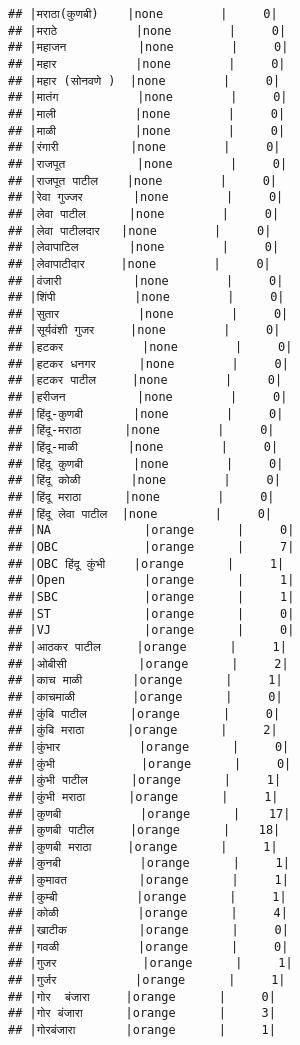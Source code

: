 \documentclass[
]{article}
\begin{document}
\begin{verbatim}
## |मराठा(कुणबी)    |none        |     0|
## |मराठे           |none        |     0|
## |महाजन          |none        |     0|
## |महार           |none        |     0|
## |महार (सोनवणे )  |none        |     0|
## |मातंग           |none        |     0|
## |माली           |none        |     0|
## |माळी           |none        |     0|
## |रंगारी          |none        |     0|
## |राजपूत          |none        |     0|
## |राजपूत पाटील    |none        |     0|
## |रेवा गुज्जर       |none        |     0|
## |लेवा पाटील      |none        |     0|
## |लेवा पाटीलदार   |none        |     0|
## |लेवापाटिल       |none        |     0|
## |लेवापाटीदार     |none        |     0|
## |वंजारी          |none        |     0|
## |शिंपी           |none        |     0|
## |सुतार           |none        |     0|
## |सूर्यवंशी गुजर     |none        |     0|
## |हटकर           |none        |     0|
## |हटकर धनगर      |none        |     0|
## |हटकर पाटील     |none        |     0|
## |हरीजन          |none        |     0|
## |हिंदू-कुणबी       |none        |     0|
## |हिंदू-मराठा      |none        |     0|
## |हिंदू-माळी       |none        |     0|
## |हिंदू कुणबी       |none        |     0|
## |हिंदू कोळी       |none        |     0|
## |हिंदू मराठा      |none        |     0|
## |हिंदू लेवा पाटील  |none        |     0|
## |NA             |orange      |     0|
## |OBC            |orange      |     7|
## |OBC हिंदू कुंभी    |orange      |     1|
## |Open           |orange      |     1|
## |SBC            |orange      |     1|
## |ST             |orange      |     0|
## |VJ             |orange      |     0|
## |आठकर पाटील     |orange      |     1|
## |ओबीसी          |orange      |     2|
## |काच माळी       |orange      |     1|
## |काचमाळी        |orange      |     0|
## |कुंबि पाटील      |orange      |     0|
## |कुंबि मराठा      |orange      |     2|
## |कुंभार           |orange      |     0|
## |कुंभी            |orange      |     0|
## |कुंभी पाटील      |orange      |     1|
## |कुंभी मराठा      |orange      |     1|
## |कुणबी           |orange      |    17|
## |कुणबी पाटील     |orange      |    18|
## |कुणबी मराठा     |orange      |     1|
## |कुनबी           |orange      |     1|
## |कुमावत          |orange      |     1|
## |कुम्बी           |orange      |     1|
## |कोळी           |orange      |     4|
## |खाटीक          |orange      |     0|
## |गवळी           |orange      |     0|
## |गुजर            |orange      |     1|
## |गुर्जर           |orange      |     1|
## |गोर  बंजारा     |orange      |     0|
## |गोर बंजारा      |orange      |     3|
## |गोरबंजारा       |orange      |     1|

\end{verbatim}
\end{document}

